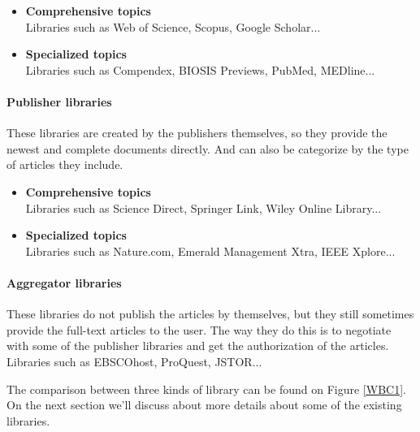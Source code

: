	\begin{itemize}
		
		\item\textbf{Comprehensive topics}\\Libraries such as Web of Science, Scopus, Google Scholar...
		\item\textbf{Specialized topics}\\Libraries such as Compendex, BIOSIS Previews, PubMed, MEDline...
		
	\end{itemize}
	
\paragraph{Publisher libraries}

	These libraries are created by the publishers themselves, so they provide the newest and complete documents directly.
	And can also be categorize by the type of articles they include.
	
	\begin{itemize}
		
		\item\textbf{Comprehensive topics}\\Libraries such as Science Direct, Springer Link, Wiley Online Library...
		\item\textbf{Specialized topics}\\Libraries such as Nature.com, Emerald Management Xtra, IEEE Xplore...
		
	\end{itemize}
	
\paragraph{Aggregator libraries}

	These libraries do not publish the articles by themselves, but they still sometimes provide the full-text articles to the user.
	The way they do this is to negotiate with some of the publisher libraries and get the authorization of the articles.
	Libraries such as EBSCOhost, ProQuest, JSTOR...

The comparison between three kinds of library can be found on Figure \ref{WBC1}.
On the next section we'll discuss about more details about some of the existing libraries.

